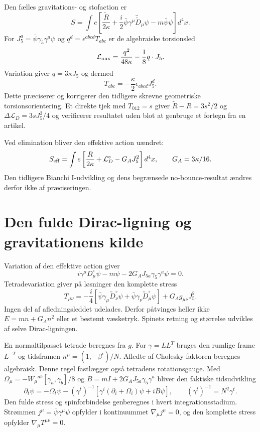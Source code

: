 \documentclass[11pt,a4paper]{article}
\begin{document}
Den fælles gravitations- og stofaction er
\[
 S=\int e\left[\frac{\widetilde R}{2\kappa}
 +\frac i2\bar\psi\gamma^\mu\overleftrightarrow{\widetilde D}_\mu\psi-m\bar\psi\psi\right]d^4x.
\]
For $J_5^a=\bar\psi\gamma_5\gamma^a\psi$ og $q^d=\epsilon^{abcd}T_{abc}$ er de algebraiske torsionsled
\[
 \mathcal L_{\rm aux}=\frac{q^2}{48\kappa}-\frac18q\cdot J_5.
\]
Variation giver $q=3\kappa J_5$ og dermed
\[
 T_{abc}=-\frac\kappa2\epsilon_{abcd}J_5^d.
\]
Dette præciserer og korrigerer den tidligere skrevne geometriske torsionsorientering. Et direkte tjek med $T_{012}=s$ giver $\widetilde R-R=3s^2/2$ og $\Delta\mathcal L_D=3sJ_5^3/4$ og verificerer resultatet uden blot at genbruge et fortegn fra en artikel.

Ved elimination bliver den effektive action uændret:
\[
 S_{\rm eff}=\int e\left[\frac R{2\kappa}+\mathcal L_D^\circ-G_AJ_5^2\right]d^4x,
 \qquad G_A=3\kappa/16.
\]
Den tidligere Bianchi I-udvikling og dens begrænsede no-bounce-resultat ændres derfor ikke af præciseringen.

\section{Den fulde Dirac-ligning og gravitationens kilde}
Variation af den effektive action giver
\[
 i\gamma^\mu D_\mu^\circ\psi-m\psi-2G_AJ_{5a}\gamma_5\gamma^a\psi=0.
\]
Tetradevariation giver på løsninger den komplette stress
\[
 T_{\mu\nu}=-\frac i4\left[\bar\psi\gamma_\mu\overleftrightarrow D_\nu^\circ\psi+
 \bar\psi\gamma_\nu\overleftrightarrow D_\mu^\circ\psi\right]+G_Ag_{\mu\nu}J_5^2.
\]
Ingen del af afledningsleddet udelades. Derfor påtvinges heller ikke $E=mn+G_A n^2$ eller et bestemt væsketryk. Spinets retning og størrelse udvikles af selve Dirac-ligningen.

En normaltilpasset tetrade beregnes fra $g$. For $\gamma=LL^T$ bruges den rumlige frame $L^{-T}$ og tidsframen $n^\mu=(1,-\beta^i)/N$. Afledte af Cholesky-faktoren beregnes algebraisk. Denne regel fastlægger også tetradens rotationsgauge. Med $\Omega_\mu=-W_\mu{}^{ab}[\gamma_a,\gamma_b]/8$ og $B=mI+2G_AJ_{5a}\gamma_5\gamma^a$ bliver den faktiske tidsudvikling
\[
 \partial_t\psi=-\Omega_t\psi-(\gamma^t)^{-1}
 [\gamma^i(\partial_i+\Omega_i)\psi+iB\psi],\qquad
 (\gamma^t)^{-1}=N^2\gamma^t.
\]
Den fulde stress og spinforbindelse genberegnes i hvert integrationsstadium. Strømmen $j^\mu=\bar\psi\gamma^\mu\psi$ opfylder i kontinuummet $\nabla_\mu j^\mu=0$, og den komplette stress opfylder $\nabla_\mu T^{\mu\nu}=0$.
\end{document}
